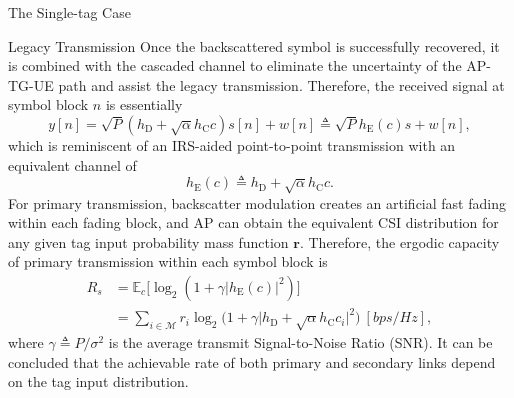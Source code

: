 \documentclass[journal]{IEEEtran}
\begin{document}
\begin{section}{The Single-tag Case}
		\begin{subsection}{Legacy Transmission}
			Once the backscattered symbol is successfully recovered, it is combined with the cascaded channel to eliminate the uncertainty of the AP-TG-UE path and assist the legacy transmission. Therefore, the received signal at symbol block $n$ is essentially
			\begin{equation}
				y[n] = \sqrt{P} (h_{\mathrm{D}} + \sqrt{\alpha} h_{\mathrm{C}} c) s[n] + w[n] \triangleq \sqrt{P} h_{\mathrm{E}}(c) s + w[n],
			\end{equation}
			which is reminiscent of an IRS-aided point-to-point transmission with an equivalent channel of
			\begin{equation}
				h_{\mathrm{E}}(c) \triangleq h_{\mathrm{D}} + \sqrt{\alpha} h_{\mathrm{C}} c.
			\end{equation}
			For primary transmission, backscatter modulation creates an artificial fast fading within each fading block, and AP can obtain the equivalent CSI distribution for any given tag input probability mass function $\boldsymbol{r}$. Therefore, the ergodic capacity of primary transmission within each symbol block is \cite{Tse2005}
			\begin{align}
				R_s
				& = \mathbb{E}_c \bigl[ \log_2 (1 + \gamma \lvert h_{\mathrm{E}}(c) \rvert^2) \bigr] \nonumber \\
				& = \sum_{i \in \mathcal{M}} r_i \log_2 \bigl( 1 + \gamma \lvert h_{\mathrm{D}} + \sqrt{\alpha} h_{\mathrm{C}} c_i \rvert^2 \bigr) \ [\si{bps/Hz}],
				\label{eq:primary_rate}
			\end{align}
			where $\gamma \triangleq P / \sigma^2$ is the average transmit Signal-to-Noise Ratio (SNR). It can be concluded that the achievable rate of both primary and secondary links depend on the tag input distribution.
		\end{subsection}
		\label{se:system_model}


\end{section}
\end{document}
